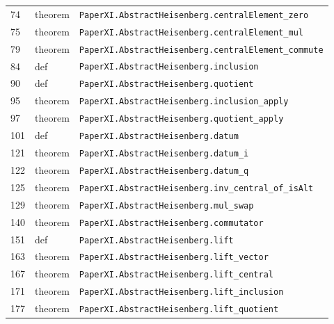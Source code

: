 \documentclass[10pt,oneside]{book}
\begin{document}
\begin{longtable}{@{}p{}p{}p{}@{}}
74&theorem&\nolinkurl{PaperXI.AbstractHeisenberg.centralElement_zero}\\

75&theorem&\nolinkurl{PaperXI.AbstractHeisenberg.centralElement_mul}\\

79&theorem&\nolinkurl{PaperXI.AbstractHeisenberg.centralElement_commute}\\

84&def&\nolinkurl{PaperXI.AbstractHeisenberg.inclusion}\\

90&def&\nolinkurl{PaperXI.AbstractHeisenberg.quotient}\\

95&theorem&\nolinkurl{PaperXI.AbstractHeisenberg.inclusion_apply}\\

97&theorem&\nolinkurl{PaperXI.AbstractHeisenberg.quotient_apply}\\

101&def&\nolinkurl{PaperXI.AbstractHeisenberg.datum}\\

121&theorem&\nolinkurl{PaperXI.AbstractHeisenberg.datum_i}\\

122&theorem&\nolinkurl{PaperXI.AbstractHeisenberg.datum_q}\\

125&theorem&\nolinkurl{PaperXI.AbstractHeisenberg.inv_central_of_isAlt}\\

129&theorem&\nolinkurl{PaperXI.AbstractHeisenberg.mul_swap}\\

140&theorem&\nolinkurl{PaperXI.AbstractHeisenberg.commutator}\\

151&def&\nolinkurl{PaperXI.AbstractHeisenberg.lift}\\

163&theorem&\nolinkurl{PaperXI.AbstractHeisenberg.lift_vector}\\

167&theorem&\nolinkurl{PaperXI.AbstractHeisenberg.lift_central}\\

171&theorem&\nolinkurl{PaperXI.AbstractHeisenberg.lift_inclusion}\\

177&theorem&\nolinkurl{PaperXI.AbstractHeisenberg.lift_quotient}\\

\bottomrule\end{longtable}
\end{document}
